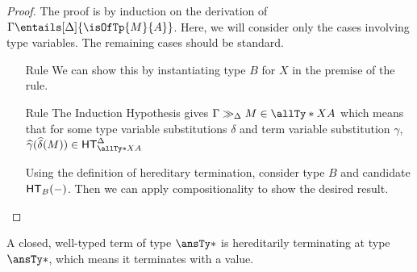 \documentclass[letterpaper]{article}
\begin{document}
\begin{proof}
    The proof is by induction on the derivation of $\Gamma \entails[\Delta]{\isOfTp{M}{A}}$. Here, we will consider only the cases involving type variables. The remaining cases should be standard.
    \begin{enumerate}
        \item [Rule \ruleref{sta:lam}] We can show this by instantiating type $B$ for $X$ in the premise of the rule.

        \item [Rule \ruleref{sta:app}] The Induction Hypothesis gives $\Gamma \gg_\Delta M \in \allTy*{X}{A}$ which means that for some type variable substitutions $\delta$ and term variable substitution $\gamma$, $\widehat{\gamma} (\widehat{\delta}(M)) \in \HT[\allTy*{X}{A}]^\Delta$

        Using the definition of hereditary termination, consider type $B$ and candidate $\HT[B](-)$. Then we can apply compositionality to show the desired result.
    \end{enumerate}

\end{proof}

\begin{corollary}
    A closed, well-typed term of type $\ansTy*$ is hereditarily terminating at type $\ansTy*$, which means it terminates with a value.
\end{corollary}
\end{document}
